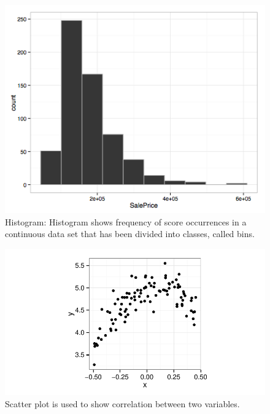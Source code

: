 \begin{figure}[htb]
      \includegraphics[width=\columnwidth]{images/histogram.png}
      \caption{Histogram: Histogram shows frequency of score occurrences in a continuous data set that has been divided into classes, called bins.}
  \end{figure}

\begin{figure}[htb]
      \includegraphics[width=\columnwidth]{images/Scatterplot.pdf}
      \caption{Scatter plot is used to show correlation between two variables.}
\end{figure}

